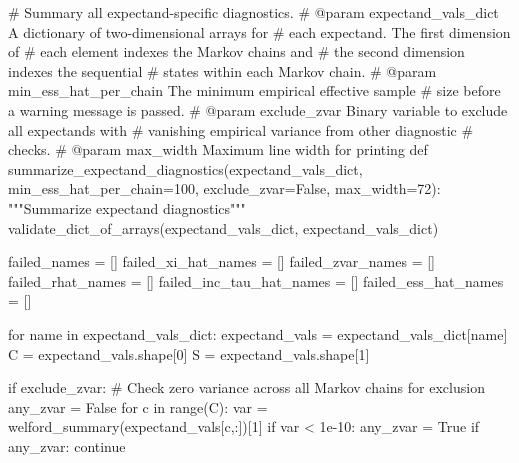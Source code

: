 \documentclass[
  letterpaper,
  DIV=11,
  numbers=noendperiod]{scrartcl}
\newenvironment{Shaded}{\begin{snugshade}}{\end{snugshade}}
\newcommand{\BuiltInTok}[1]{\textcolor[rgb]{0.00,0.23,0.31}{#1}}
\newcommand{\CommentTok}[1]{\textcolor[rgb]{0.37,0.37,0.37}{#1}}
\newcommand{\ControlFlowTok}[1]{\textcolor[rgb]{0.00,0.23,0.31}{#1}}
\newcommand{\DecValTok}[1]{\textcolor[rgb]{0.68,0.00,0.00}{#1}}
\newcommand{\FloatTok}[1]{\textcolor[rgb]{0.68,0.00,0.00}{#1}}
\newcommand{\KeywordTok}[1]{\textcolor[rgb]{0.00,0.23,0.31}{#1}}
\newcommand{\NormalTok}[1]{\textcolor[rgb]{0.00,0.23,0.31}{#1}}
\newcommand{\OperatorTok}[1]{\textcolor[rgb]{0.37,0.37,0.37}{#1}}
\newcommand{\StringTok}[1]{\textcolor[rgb]{0.13,0.47,0.30}{#1}}
\newcommand{\VariableTok}[1]{\textcolor[rgb]{0.07,0.07,0.07}{#1}}
\begin{document}
\begin{Shaded}
\begin{Highlighting}[]
\CommentTok{\# Summary all expectand{-}specific diagnostics.}
\CommentTok{\# @param expectand\_vals\_dict A dictionary of two{-}dimensional arrays for}
\CommentTok{\#                            each expectand.  The first dimension of}
\CommentTok{\#                            each element indexes the Markov chains and}
\CommentTok{\#                            the second dimension indexes the sequential}
\CommentTok{\#                            states within each Markov chain.}
\CommentTok{\# @param min\_ess\_hat\_per\_chain The minimum empirical effective sample}
\CommentTok{\#                              size before a warning message is passed.}
\CommentTok{\# @param exclude\_zvar Binary variable to exclude all expectands with}
\CommentTok{\#                     vanishing empirical variance from other diagnostic}
\CommentTok{\#                     checks.}
\CommentTok{\# @param max\_width Maximum line width for printing}
\KeywordTok{def}\NormalTok{ summarize\_expectand\_diagnostics(expectand\_vals\_dict,}
\NormalTok{                                    min\_ess\_hat\_per\_chain}\OperatorTok{=}\DecValTok{100}\NormalTok{,}
\NormalTok{                                    exclude\_zvar}\OperatorTok{=}\VariableTok{False}\NormalTok{,}
\NormalTok{                                    max\_width}\OperatorTok{=}\DecValTok{72}\NormalTok{):}
  \CommentTok{"""Summarize expectand diagnostics"""}
\NormalTok{  validate\_dict\_of\_arrays(expectand\_vals\_dict, }\StringTok{\textquotesingle{}expectand\_vals\_dict\textquotesingle{}}\NormalTok{)}

\NormalTok{  failed\_names }\OperatorTok{=}\NormalTok{ []}
\NormalTok{  failed\_xi\_hat\_names }\OperatorTok{=}\NormalTok{ []}
\NormalTok{  failed\_zvar\_names }\OperatorTok{=}\NormalTok{ []}
\NormalTok{  failed\_rhat\_names }\OperatorTok{=}\NormalTok{ []}
\NormalTok{  failed\_inc\_tau\_hat\_names }\OperatorTok{=}\NormalTok{ []}
\NormalTok{  failed\_ess\_hat\_names }\OperatorTok{=}\NormalTok{ []}

  \ControlFlowTok{for}\NormalTok{ name }\KeywordTok{in}\NormalTok{ expectand\_vals\_dict:}
\NormalTok{    expectand\_vals }\OperatorTok{=}\NormalTok{ expectand\_vals\_dict[name]}
\NormalTok{    C }\OperatorTok{=}\NormalTok{ expectand\_vals.shape[}\DecValTok{0}\NormalTok{]}
\NormalTok{    S }\OperatorTok{=}\NormalTok{ expectand\_vals.shape[}\DecValTok{1}\NormalTok{]}
    
    \ControlFlowTok{if}\NormalTok{ exclude\_zvar:}
      \CommentTok{\# Check zero variance across all Markov chains for exclusion}
\NormalTok{      any\_zvar }\OperatorTok{=} \VariableTok{False}
      \ControlFlowTok{for}\NormalTok{ c }\KeywordTok{in} \BuiltInTok{range}\NormalTok{(C):}
\NormalTok{        var }\OperatorTok{=}\NormalTok{ welford\_summary(expectand\_vals[c,:])[}\DecValTok{1}\NormalTok{]}
        \ControlFlowTok{if}\NormalTok{ var }\OperatorTok{\textless{}} \FloatTok{1e{-}10}\NormalTok{:}
\NormalTok{          any\_zvar }\OperatorTok{=} \VariableTok{True}
      \ControlFlowTok{if}\NormalTok{ any\_zvar:}
        \ControlFlowTok{continue}
    

\end{Highlighting}
\end{Shaded}
\end{document}
